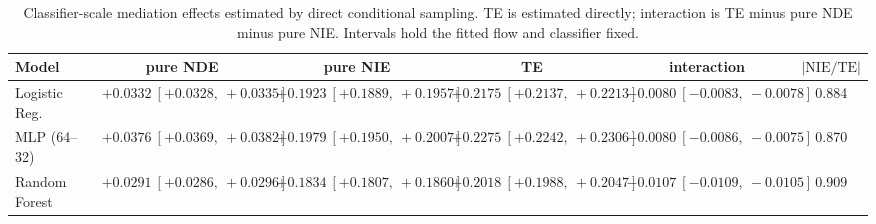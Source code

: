 \begin{table}[htbp]
  \centering
  \caption{Classifier-scale mediation effects estimated by direct conditional sampling. TE is estimated directly; interaction is TE minus pure NDE minus pure NIE. Intervals hold the fitted flow and classifier fixed.}
  \label{tab:german_synth_gap_overall}
  \begin{tabular}{lccccc}
    \toprule
    Model & pure NDE & pure NIE & TE & interaction & $|\mathrm{NIE}/\mathrm{TE}|$ \\
    \midrule
    Logistic Reg. & $+0.0332\ [+0.0328,\ +0.0335]$ & $+0.1923\ [+0.1889,\ +0.1957]$ & $+0.2175\ [+0.2137,\ +0.2213]$ & $-0.0080\ [-0.0083,\ -0.0078]$ & 0.884 \\
    MLP (64--32) & $+0.0376\ [+0.0369,\ +0.0382]$ & $+0.1979\ [+0.1950,\ +0.2007]$ & $+0.2275\ [+0.2242,\ +0.2306]$ & $-0.0080\ [-0.0086,\ -0.0075]$ & 0.870 \\
    Random Forest & $+0.0291\ [+0.0286,\ +0.0296]$ & $+0.1834\ [+0.1807,\ +0.1860]$ & $+0.2018\ [+0.1988,\ +0.2047]$ & $-0.0107\ [-0.0109,\ -0.0105]$ & 0.909 \\
    \bottomrule
  \end{tabular}
\end{table}